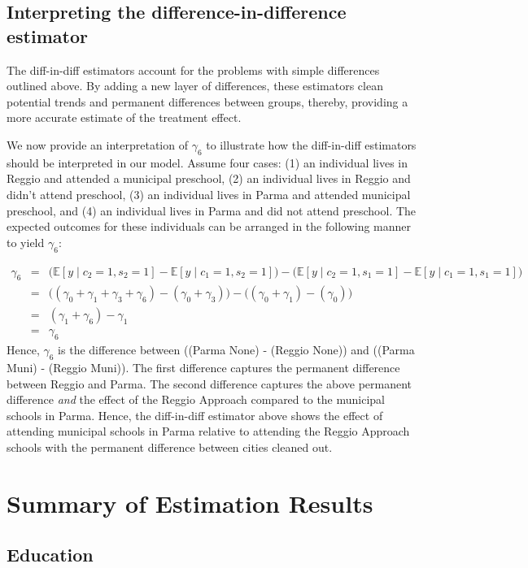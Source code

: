 \documentclass[11pt]{article}
\begin{document}
\subsection{Interpreting the difference-in-difference estimator}
The diff-in-diff estimators account for the problems with simple differences outlined above. By adding a new layer of differences, these estimators clean potential trends and permanent differences between groups, thereby, providing a more accurate estimate of the treatment effect.

We now provide an interpretation of $\gamma_6$ to illustrate how the diff-in-diff estimators should be interpreted in our model. Assume four cases: (1) an individual lives in Reggio and attended a municipal preschool, (2) an individual lives in Reggio and didn't attend preschool, (3) an individual lives in Parma and attended municipal preschool, and (4) an individual lives in Parma and did not attend preschool. The expected outcomes for these individuals can be arranged in the following manner to yield $\gamma_6$:


\begin{eqnarray*}
\gamma_6 & = & \Big(\mathbb{E}[y \mid c_2 = 1, s_2 = 1] - \mathbb{E}[y \mid c_1 = 1, s_2 = 1] \Big) - \Big(\mathbb{E}[y \mid c_2 = 1, s_1 = 1] - \mathbb{E}[y \mid c_1 = 1, s_1 = 1] \Big) \\
& = & \Big((\gamma_0 + \gamma_1 + \gamma_3 + \gamma_6) - (\gamma_0 + \gamma_3)\Big) - \Big((\gamma_0 + \gamma_1) - (\gamma_0) \Big) \\
& = & (\gamma_1 + \gamma_6) - \gamma_1 \\
& = & \gamma_6
\end{eqnarray*}
Hence, $\gamma_6$ is the difference between \Big((Parma None) - (Reggio None)\Big) and \Big((Parma Muni) - (Reggio Muni)\Big). The first difference captures the permanent difference between Reggio and Parma. The second difference captures the above permanent difference \textit{and} the effect of the Reggio Approach compared to the municipal schools in Parma. Hence, the diff-in-diff estimator above shows the effect of attending municipal schools in Parma relative to attending the Reggio Approach schools with the permanent difference between cities cleaned out.

\section{Summary of Estimation Results}
\subsection{Education}
\end{document}
